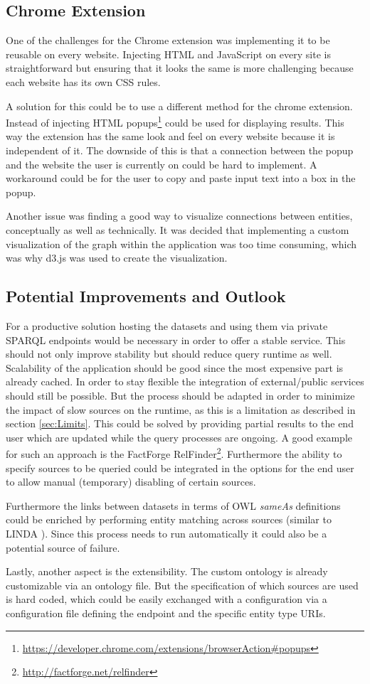 \subsection{Chrome Extension}
One of the challenges for the Chrome extension was implementing it to be reusable on every website. Injecting HTML and JavaScript on every site is straightforward but ensuring that it looks the same is more challenging because each website has its own CSS rules.

A solution for this could be to use a different method for the chrome extension. Instead of injecting HTML popups\footnote{\url{https://developer.chrome.com/extensions/browserAction\#popups}} could be used for displaying results. This way the extension has the same look and feel on every website because it is independent of it. The downside of this is that a connection between the popup and the website the user is currently on could be hard to implement. A workaround could be for the user to copy and paste input text into a box in the popup. 

Another issue was finding a good way to visualize connections between entities, conceptually as well as technically. It was decided that implementing a custom visualization of the graph within the application was too time consuming, which was why d3.js was used to create the visualization.


\subsection{Potential Improvements and Outlook}
For a productive solution hosting the datasets and using them via private SPARQL endpoints would be necessary in order to offer a stable service. This should not only improve stability but should reduce query runtime as well. Scalability of the application should be good since the most expensive part is already cached. 
In order to stay flexible the integration of external/public services should still be possible. But the process should be adapted in order to minimize the impact of slow sources on the runtime, as this is a limitation as described in section \ref{sec:Limits}. This could be solved by providing partial results to the end user which are updated while the query processes are ongoing. A good example for such an approach is the FactForge RelFinder\footnote{\url{http://factforge.net/relfinder}}. Furthermore the ability to specify sources to be queried could be integrated in the options for the end user to allow manual (temporary) disabling of certain sources. 

Furthermore the links between datasets in terms of OWL \textit{sameAs} definitions could be enriched by performing entity matching across sources (similar to LINDA \cite{boehm_linda:_2012}). Since this process needs to run automatically it could also be a potential source of failure. 

Lastly, another aspect is the extensibility. The custom ontology is already customizable via an ontology file. But the specification of which sources are used is hard coded, which could be easily exchanged with a configuration via a configuration file defining the endpoint and the specific entity type URIs. 



